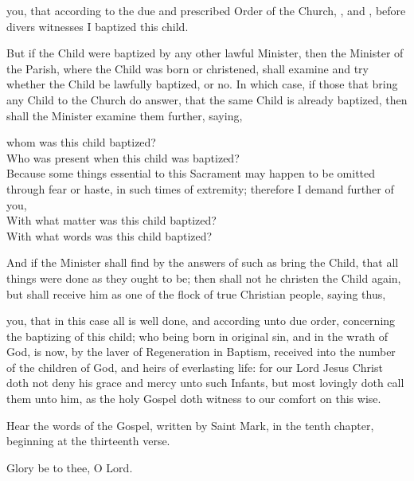  you, that according to the due and prescribed Order of the Church, , and , before divers witnesses I baptized this child.

\begin{rubric}
But if the Child were baptized by any other lawful Minister, then the Minister of the Parish, where the Child was born or christened, shall examine and try whether the Child be lawfully baptized, or no.
In which case, if those that bring any Child to the Church do answer, that the same Child is already baptized, then shall the Minister examine them further, saying,
\end{rubric}

 whom was this child baptized?\\
Who was present when this child was baptized?\\
Because some things essential to this Sacrament may happen to be omitted through fear or haste, in such times of extremity; therefore I demand further of you,\\
With what matter was this child baptized?\\
With what words was this child baptized?\\

\begin{rubric}
And if the Minister shall find by the answers of such as bring the Child, that all things were done as they ought to be; then shall not he christen the Child again, but shall receive him as one of the flock of true Christian people, saying thus,
\end{rubric}

 you, that in this case all is well done, and according unto due order, concerning the baptizing of this child; who being born in original sin, and in the wrath of God, is now, by the laver of Regeneration in Baptism, received into the number of the children of God, and heirs of everlasting life: for our Lord Jesus Christ doth not deny his grace and mercy unto such Infants, but most lovingly doth call them unto him, as the holy Gospel doth witness to our comfort on this wise.

\newpage

\begin{leftbar}

\begin{center}
Hear the words of the Gospel, written by Saint Mark, in the tenth chapter, beginning at the thirteenth verse.
\end{center}

 Glory be to thee, O Lord.

\end{leftbar}

